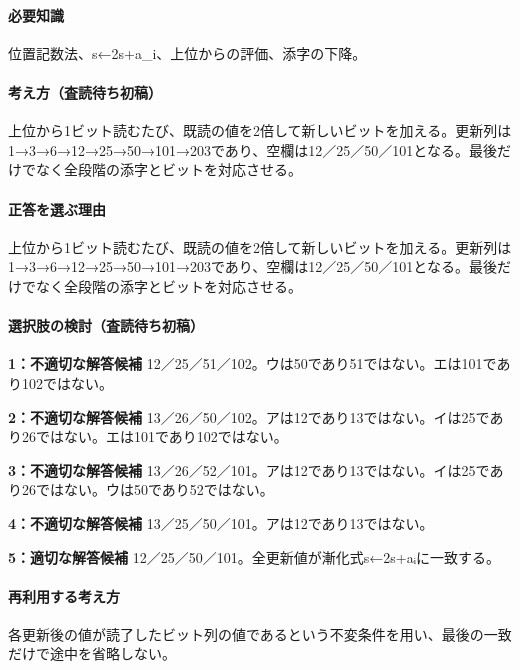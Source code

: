 \paragraph{必要知識} 位置記数法、s←2s+a\_i、上位からの評価、添字の下降。

\paragraph{考え方（査読待ち初稿）} 上位から1ビット読むたび、既読の値を2倍して新しいビットを加える。更新列は1→3→6→12→25→50→101→203であり、空欄は12／25／50／101となる。最後だけでなく全段階の添字とビットを対応させる。

\paragraph{正答を選ぶ理由} 上位から1ビット読むたび、既読の値を2倍して新しいビットを加える。更新列は1→3→6→12→25→50→101→203であり、空欄は12／25／50／101となる。最後だけでなく全段階の添字とビットを対応させる。

\paragraph{選択肢の検討（査読待ち初稿）}

\noindent\textbf{1：不適切な解答候補} 12／25／51／102。ウは50であり51ではない。エは101であり102ではない。\par

\noindent\textbf{2：不適切な解答候補} 13／26／50／102。アは12であり13ではない。イは25であり26ではない。エは101であり102ではない。\par

\noindent\textbf{3：不適切な解答候補} 13／26／52／101。アは12であり13ではない。イは25であり26ではない。ウは50であり52ではない。\par

\noindent\textbf{4：不適切な解答候補} 13／25／50／101。アは12であり13ではない。\par

\noindent\textbf{5：適切な解答候補} 12／25／50／101。全更新値が漸化式s←2s+aᵢに一致する。\par

\paragraph{再利用する考え方} 各更新後の値が読了したビット列の値であるという不変条件を用い、最後の一致だけで途中を省略しない。

